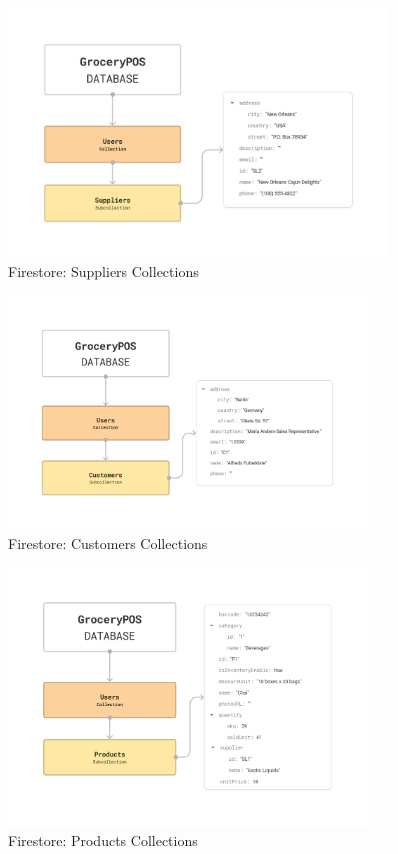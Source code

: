 \documentclass[../thesis.tex]{subfiles}
\begin{document}
\begin{figure}[H]
    \centering
    \includegraphics[width=0.9\textwidth]{images/Firestore_SuppliersCollections.png}
    \caption{Firestore: Suppliers Collections}
    \label{fig:Firestore_SuppliersCollections}
\end{figure}

\begin{figure}[H]
    \centering
    \includegraphics[width=0.85\textwidth]{images/Firestore_CustomersCollections.png}
    \caption{Firestore: Customers Collections}
    \label{fig:Firestore_CustomersCollections}
\end{figure}

\begin{figure}[H]
    \centering
    \includegraphics[width=0.85\textwidth]{images/Firestore_ProductsCollections.png}
    \caption{Firestore: Products Collections}
    \label{fig:Firestore_ProductsCollections}
\end{figure}
\end{document}
